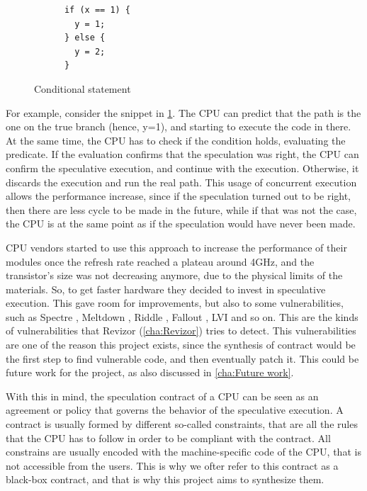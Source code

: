 \begin{figure}
  \centering
  \begin{varwidth}
    {\linewidth} \begin{verbatim}
      if (x == 1) {
        y = 1;
      } else {
        y = 2;
      }
          \end{verbatim}
  \end{varwidth}
  \label{fig:snip1}
  \caption{Conditional statement}
\end{figure}

For example, consider the snippet in \cref{fig:snip1}. The CPU can predict that the
path is the one on the true branch (hence, y=1), and starting to execute the code
in there. At the same time, the CPU has to check if the condition holds,
evaluating the predicate. If the evaluation confirms that the speculation was right,
the CPU can confirm the speculative execution, and continue with the execution.
Otherwise, it discards the execution and run the real path. This usage of
concurrent execution allows the performance increase, since if the speculation turned
out to be right, then there are less cycle to be made in the future, while if that
was not the case, the CPU is at the same point as if the speculation would have
never been made.

CPU vendors started to use this approach to increase the performance of their
modules once the refresh rate reached a plateau around 4GHz, and the transistor's
size was not decreasing anymore, due to the physical limits of the materials. So,
to get faster hardware they decided to invest in speculative execution. This gave
room for improvements, but also to some vulnerabilities, such as Spectre \cite{spectreattack},
Meltdown \cite{meltdownattack}, Riddle \cite{ridl}, Fallout \cite{fallout}, LVI \cite{lvi}
and so on. This are the kinds of vulnerabilities that Revizor \cite{article} (\cref{cha:Revizor})
tries to detect. This vulnerabilities are one of the reason this project exists,
since the synthesis of contract would be the first step to find vulnerable code,
and then eventually patch it. This could be future work for the project, as also
discussed in \cref{cha:Future work}.

With this in mind, the speculation contract of a CPU can be seen as an agreement
or policy that governs the behavior of the speculative execution. A contract is usually
formed by different so-called constraints, that are all the rules that the CPU
has to follow in order to be compliant with the contract. All constrains are usually
encoded with the machine-specific code of the CPU, that is not accessible from
the users. This is why we ofter refer to this contract as a black-box contract,
and that is why this project aims to synthesize them.


